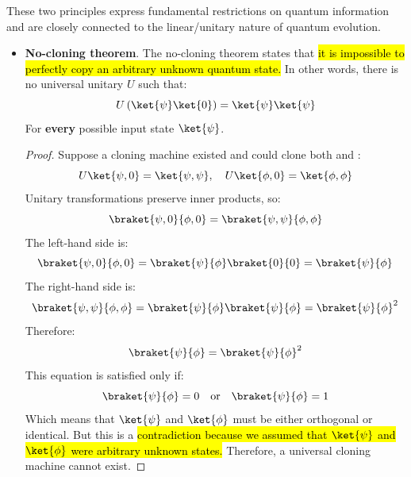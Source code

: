 {}
\highspace
{} These two principles express fundamental restrictions on quantum information and are closely connected to the linear/unitary nature of quantum evolution.
\begin{itemize}
    \item \textbf{No-cloning theorem}. The no-cloning theorem states that \hl{it is impossible to perfectly copy an arbitrary unknown quantum state.} In other words, there is no universal unitary $U$ such that:
        \begin{equation*}
            U\left(\ket{\psi}\ket{0}\right) = \ket{\psi}\ket{\psi}
        \end{equation*}
        For \textbf{every} possible input state $\ket{\psi}$.

        \begin{proof}
            Suppose a cloning machine existed and could clone both \ket{\psi} and \ket{\phi}:
            \begin{equation*}
                U\ket{\psi, 0} = \ket{\psi, \psi}, \quad U\ket{\phi, 0} = \ket{\phi, \phi}
            \end{equation*}
            Unitary transformations preserve inner products, so:
            \begin{equation*}
                \braket{\psi, 0}{\phi, 0} = \braket{\psi, \psi}{\phi, \phi}
            \end{equation*}
            The left-hand side is:
            \begin{equation*}
                \braket{\psi, 0}{\phi, 0} = \braket{\psi}{\phi}\braket{0}{0} = \braket{\psi}{\phi}
            \end{equation*}
            The right-hand side is:
            \begin{equation*}
                \braket{\psi, \psi}{\phi, \phi} = \braket{\psi}{\phi}\braket{\psi}{\phi} = \braket{\psi}{\phi}^2
            \end{equation*}
            Therefore:
            \begin{equation*}
                \braket{\psi}{\phi} = \braket{\psi}{\phi}^2
            \end{equation*}
            This equation is satisfied only if:
            \begin{equation*}
                \braket{\psi}{\phi} = 0 \quad \text{or} \quad \braket{\psi}{\phi} = 1
            \end{equation*}
            Which means that $\ket{\psi}$ and $\ket{\phi}$ must be either orthogonal or identical. But this is a \hl{contradiction because we assumed that $\ket{\psi}$ and $\ket{\phi}$ were arbitrary unknown states.} Therefore, a universal cloning machine cannot exist.
        \end{proof}


\end{itemize}
